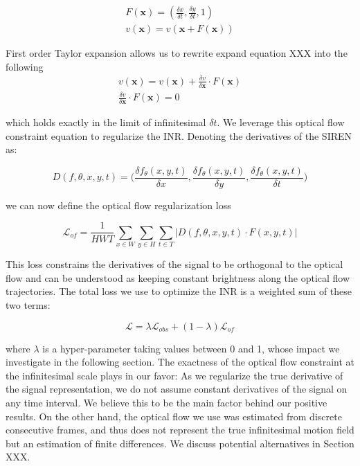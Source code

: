 \documentclass{article}
\begin{document}
\begin{equation}
\begin{aligned}
F(\textbf{x})=(\frac{\delta x}{\delta t}, \frac{\delta y}{\delta t}, 1) \\
v(\textbf{x})=v(\textbf{x} + F(\textbf{x}))
\end{aligned}
\end{equation}

First order Taylor expansion allows us to rewrite expand equation XXX into the following
\begin{equation}
\begin{aligned}
v(\textbf{x}) = v(\textbf{x}) + \frac{\delta v}{\delta \textbf{x}} \cdot F(\textbf{x}) \\
\frac{\delta v}{\delta \textbf{x}} \cdot F(\textbf{x}) =0
\end{aligned}
\end{equation}


which holds exactly in the limit of infinitesimal $\delta t$.
We leverage this optical flow constraint equation to regularize the INR.
Denoting the derivatives of the SIREN as:

\begin{equation}
D(f, \theta, x, y, t)=\Big(\frac{\delta f_{\theta}(x,y,t)}{\delta x}, \frac{\delta f_{\theta}(x,y,t)}{\delta y}, \frac{\delta f_{\theta}(x,y,t)}{\delta t}\Big)
\end{equation}

we can now define the optical flow regularization loss

\begin{equation}
\mathcal{L}_{of} = \frac{1}{HWT} \sum_{x \in W}\sum_{y \in H}\sum_{t \in T} | D(f, \theta, x, y, t) \cdot F(x, y, t) |
\end{equation}

This loss constrains the derivatives of the signal to be orthogonal to the optical flow and
can be understood as keeping constant brightness along the optical flow trajectories.
The total loss we use to optimize the INR is a weighted sum of these two terms:

\begin{equation}
\mathcal{L} = \lambda \mathcal{L}_{obs} + (1-\lambda) \mathcal{L}_{of}
\end{equation}

where $\lambda$ is a hyper-parameter taking values between 0 and 1, whose impact we investigate in the following section.
The exactness of the optical flow constraint at the infinitesimal scale plays in our favor:
As we regularize the true derivative of the signal representation,
we do not assume constant derivatives of the signal on any time interval.
We believe this to be the main factor behind our positive results.
On the other hand, the optical flow we use was estimated from discrete consecutive frames,
and thus does not represent the true infinitesimal motion field but an estimation of finite differences.
We discuss potential alternatives in Section XXX.
\end{document}
